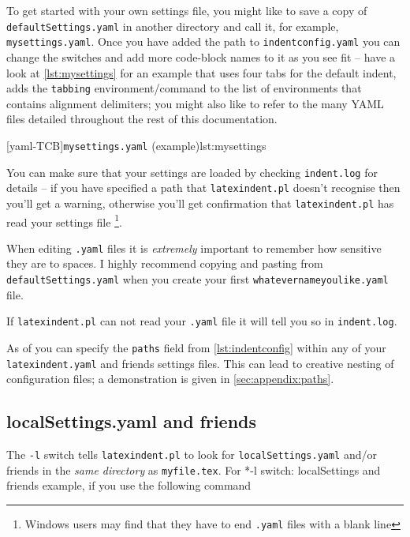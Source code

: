  To get started with your own settings file, you might like to save a copy of
 \texttt{defaultSettings.yaml} in another directory and call it, for example,
 \texttt{mysettings.yaml}. Once you have added the path to \texttt{indentconfig.yaml} you
 can change the switches and add more code-block names to it as you see fit -- have a
 look at \cref{lst:mysettings} for an example that uses four tabs for the default indent,
 adds the \texttt{tabbing} environment/command to the list of environments that contains
 alignment delimiters; you might also like to refer to the many YAML files detailed
 throughout the rest of this documentation. 

 [yaml-TCB]{\texttt{mysettings.yaml} (example)}{lst:mysettings}

 You can make sure that your settings are loaded by checking \texttt{indent.log} for
 details -- if you have specified a path that \texttt{latexindent.pl} doesn't recognise
 then you'll get a warning, otherwise you'll get confirmation that
 \texttt{latexindent.pl} has read your settings file \footnote{Windows users may find
 that they have to end \texttt{.yaml} files with a blank line}. 

 \begin{warning}
  When editing \texttt{.yaml} files it is \emph{extremely} important to remember how
  sensitive they are to spaces. I highly recommend copying and pasting from
  \texttt{defaultSettings.yaml} when you create your first
  \texttt{whatevernameyoulike.yaml} file.

  If \texttt{latexindent.pl} can not read your \texttt{.yaml} file it will tell you so in
  \texttt{indent.log}.
 \end{warning}

 As of  you can specify the
 \texttt{paths} field from \cref{lst:indentconfig} within any of your
 \texttt{latexindent.yaml} and friends settings files. This can lead to creative nesting
 of configuration files; a demonstration is given in \vref{sec:appendix:paths}.


\subsection{localSettings.yaml and friends}\label{sec:localsettings}
 The \texttt{-l} switch tells \texttt{latexindent.pl} to look for
 \texttt{localSettings.yaml} and/or friends in the \emph{same directory} as
 \texttt{myfile.tex}. For%
 *{-l
 switch: localSettings and friends} example, if you use the following command


